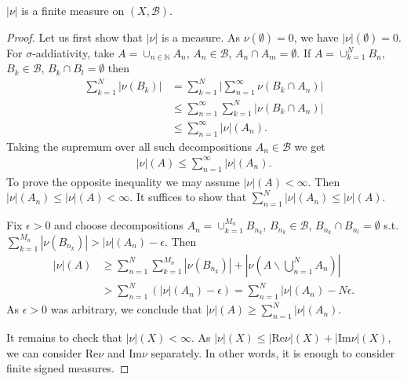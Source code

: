 \begin{proposition}
    \(|\nu|\) is a finite measure on \((X,\mathscr{B})\).
\end{proposition}
\ifdetailed
\begin{proof}
    Let us first show that \(|\nu|\) is a measure. As \(\nu(\emptyset)=0\), we have \(|\nu|(\emptyset)=0\). For \(\sigma\)-addiativity, take \(A=\cup_{n\in\mathbb{N}}A_n\), \(A_n\in\mathscr{B}\), \(A_n\cap A_m = \emptyset\). If \(A=\cup_{k=1}^{N}B_n\), \(B_k\in\mathscr{B}\), \(B_k\cap B_l = \emptyset\) then
    \begin{align*}
        \sum\limits_{k=1}^{N}|\nu(B_k)| &= \sum\limits_{k=1}^{N}\vert \sum\limits_{n=1}^{\infty}\nu\left(B_k\cap A_n\right)\vert \\
        &\leq \sum\limits_{n=1}^{\infty}\sum\limits_{k=1}^{N} \vert \nu\left(B_k\cap A_n\right) \vert \\ 
        &\leq \sum\limits_{n=1}^{\infty}\vert \nu\vert(A_n).
    \end{align*}
    Taking the supremum over all such decompositions \(A_n\in\mathscr{B}\) we get
    \begin{align*}
        |\nu|(A) \leq \sum\limits_{n=1}^{\infty}|\nu|(A_n).
    \end{align*}
    To prove the opposite inequality we may assume \(|\nu|(A)<\infty\). Then \(|\nu|(A_n)\leq |\nu|(A)<\infty\). It suffices to show that \(\sum_{n=1}^{N}|\nu|(A_n)\leq |\nu|(A)\).

    Fix \(\epsilon>0\) and choose decompositions \(A_n=\cup_{k=1}^{M_n}B_{n_k}\), \(B_{n_k}\in\mathscr{B}\), \(B_{n_k}\cap B_{n_l}=\emptyset\) s.t. \(\sum_{k=1}^{M_n}|\nu(B_{n_k})| > |\nu|(A_n) - \epsilon\). Then
    \begin{align*}
        |\nu|(A) &\geq \sum\limits_{n=1}^{N}\sum\limits_{k=1}^{M_n}|\nu(B_{n_k})| + |\nu\left(A\backslash \bigcup\limits_{n=1}^{N}A_n\right)| \\
        &> \sum\limits_{n=1}^{N} \left(|\nu|(A_n) - \epsilon\right)
        = \sum\limits_{n=1}^{N}|\nu|(A_n) - N\epsilon.
    \end{align*}
    As \(\epsilon>0\) was arbitrary, we conclude that \(|\nu|(A)\geq \sum_{n=1}^{N}|\nu|(A_n)\).

    It remains to check that \(|\nu|(X)<\infty\). As \(|\nu|(X) \leq |\text{Re}\nu|(X) + |\text{Im}\nu|(X)\), we can consider Re\(\nu\) and Im\(\nu\) separately. In other words, it is enough to consider finite signed measures.


\end{proof}
